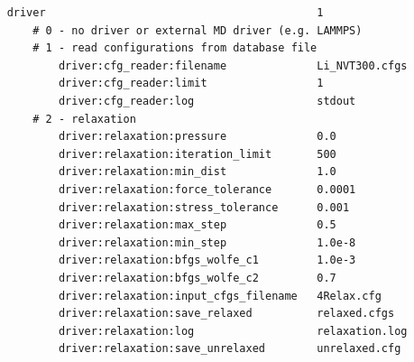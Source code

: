 \documentclass[12pt]{article}
\renewcommand{\_}{\char`_}
\begin{document}
{\begin{verbatim}
	driver                                          1					
	    # 0 - no driver or external MD driver (e.g. LAMMPS)
	    # 1 - read configurations from database file						
	        driver:cfg_reader:filename              Li_NVT300.cfgs			
	        driver:cfg_reader:limit                 1					
	        driver:cfg_reader:log                   stdout				
	    # 2 - relaxation													
	        driver:relaxation:pressure              0.0						
	        driver:relaxation:iteration_limit       500					
	        driver:relaxation:min_dist              1.0						
	        driver:relaxation:force_tolerance       0.0001					
	        driver:relaxation:stress_tolerance      0.001								
	        driver:relaxation:max_step              0.5						
	        driver:relaxation:min_step              1.0e-8				
	        driver:relaxation:bfgs_wolfe_c1         1.0e-3					
	        driver:relaxation:bfgs_wolfe_c2         0.7					
	        driver:relaxation:input_cfgs_filename   4Relax.cfg
	        driver:relaxation:save_relaxed          relaxed.cfgs		
	        driver:relaxation:log                   relaxation.log		
	       	driver:relaxation:save_unrelaxed        unrelaxed.cfg	  
	\end{verbatim}
}
\end{document}
